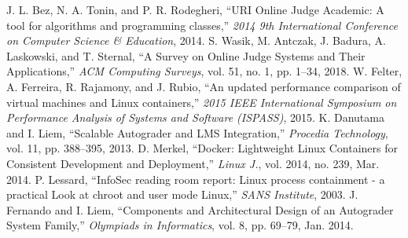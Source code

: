 \documentclass[conference]{IEEEtran}
\begin{document}
\begin{thebibliography}{00}

 J. L. Bez, N. A. Tonin, and P. R. Rodegheri, ``URI Online Judge Academic: A tool for algorithms and programming classes,'' \textit{2014 9th International Conference on Computer Science \& Education}, 2014.
 S. Wasik, M. Antczak, J. Badura, A. Laskowski, and T. Sternal, ``A Survey on Online Judge Systems and Their Applications,'' \textit{ACM Computing Surveys}, vol. 51, no. 1, pp. 1–34, 2018.
 W. Felter, A. Ferreira, R. Rajamony, and J. Rubio, ``An updated performance comparison of virtual machines and Linux containers,'' \textit{2015 IEEE International Symposium on Performance Analysis of Systems and Software (ISPASS)}, 2015.
 K. Danutama and I. Liem, ``Scalable Autograder and LMS Integration,'' \textit{Procedia Technology}, vol. 11, pp. 388–395, 2013.
 D. Merkel, ``Docker: Lightweight Linux Containers for Consistent Development and Deployment,'' \textit{Linux J.}, vol. 2014, no. 239, Mar. 2014.
 P. Lessard, ``InfoSec reading room report: Linux process containment - a practical Look at chroot and user mode Linux,'' \textit{SANS Institute}, 2003.
 J. Fernando and I. Liem, ``Components and Architectural Design of an Autograder System Family,'' \textit{Olympiads in Informatics}, vol. 8, pp. 69–79, Jan. 2014.

\end{thebibliography}
\end{document}
